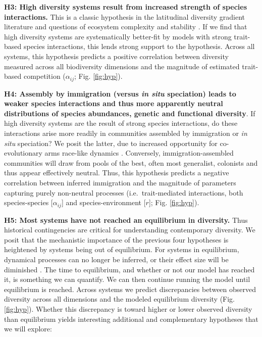 \documentclass[11pt]{article}
\begin{document}
\textbf{H3: High diversity systems result from increased strength of
  species interactions.} This is a classic hypothesis in the
latitudinal diversity gradient literature \cite{Pianka1966-ky} and
questions of ecosystem complexity and stability \cite{May1973-ua,
  Nuismer2013-wd}. If we find that high diversity systems are
systematically better-fit by models with strong trait-based species
interactions, this lends strong support to the hypothesis. Across all
systems, this hypothesis predicts a positive correlation between
diversity measured across all biodiversity dimensions and the
magnitude of estimated trait-based competition ($\alpha_{ij}$;
Fig. \ref{fig:hyp}).

\textbf{H4: Assembly by immigration (versus \emph{in situ} speciation)
  leads to weaker species interactions and thus more apparently
  neutral distributions of species abundances, genetic and functional
  diversity}.  If high diversity systems are the result of strong
species interactions, do these interactions arise more readily in
communities assembled by immigration or \emph{in situ} speciation? We
posit the latter, due to increased opportunity for co-evolutionary
arms race-like dynamics \cite{Quental2013-qv,
  ODwyer2014-gw}. Conversely, immigration-assembled communities will
draw from pools of the best, often most generalist, colonists and thus
appear effectively neutral. Thus, this hypothesis predicts a negative
correlation between inferred immigration and the magnitude of
parameters capturing purely non-neutral processes (i.e.~trait-mediated
interactions, both species-species {[}$\alpha_{ij}${]} and
species-environment {[}$r${]}; Fig.  \ref{fig:hyp}).

\textbf{H5: Most systems have not reached an equilibrium in
  diversity.}  Thus historical contingencies are critical for
understanding contemporary diversity. We posit that the mechanistic
importance of the previous four hypotheses is heightened by systems
being out of equilibrium. For systems in equilibrium, dynamical
processes can no longer be inferred, or their effect size will be
diminished \cite{Rabosky2009-gs}. The time to equilibrium, and whether
or not our model has reached it, is something we can quantify. We can
then continue running the model until equilibrium is reached. Across
systems we predict discrepancies between observed diversity across all
dimensions and the modeled equilibrium diversity
(Fig. \ref{fig:hyp}). Whether this discrepancy is toward higher or
lower observed diversity than equilibrium yields interesting
additional and complementary hypotheses that we will explore:
\end{document}
